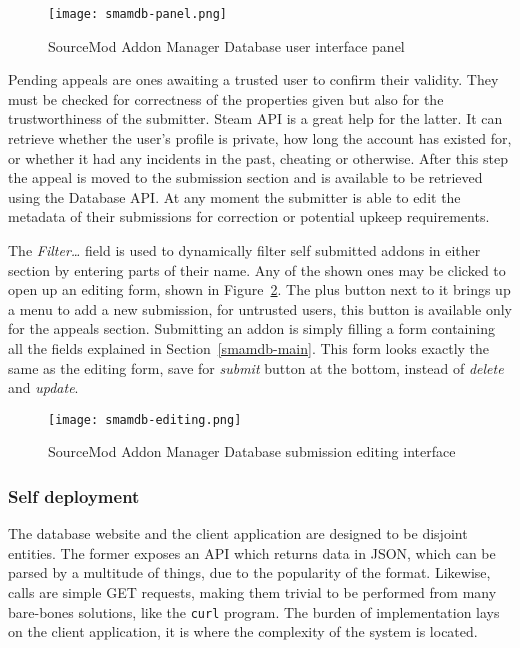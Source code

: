 \begin{figure}[H]
  \centering
  \texttt{[image: smamdb-panel.png]}
  \caption{SourceMod Addon Manager Database user interface panel}
  \label{fig:smamdb-panel}
\end{figure}

Pending appeals are ones awaiting a trusted user to confirm their validity.
They must be checked for correctness of the properties given but also for the trustworthiness of the submitter.
Steam API is a great help for the latter.
It can retrieve whether the user's profile is private, how long the account has existed for, or whether it had any incidents in the past, cheating or otherwise.
After this step the appeal is moved to the submission section and is available to be retrieved using the Database API\@.
At any moment the submitter is able to edit the metadata of their submissions for correction or potential upkeep requirements.

The \textit{Filter\dots} field is used to dynamically filter self submitted addons in either section by entering parts of their name.
Any of the shown ones may be clicked to open up an editing form, shown in Figure~\ref{fig:smamdb-editing}.
The plus button next to it brings up a menu to add a new submission, for untrusted users, this button is available only for the appeals section.
Submitting an addon is simply filling a form containing all the fields explained in Section~\ref{smamdb-main}.
This form looks exactly the same as the editing form, save for \textit{submit} button at the bottom, instead of \textit{delete} and \textit{update}.

\begin{figure}[H]
  \centering
  \texttt{[image: smamdb-editing.png]}
  \caption{SourceMod Addon Manager Database submission editing interface}
  \label{fig:smamdb-editing}
\end{figure}

\subsubsection{Self deployment}

The database website and the client application are designed to be disjoint entities.
The former exposes an API which returns data in JSON, which can be parsed by a multitude of things, due to the popularity of the format.
Likewise, calls are simple GET requests, making them trivial to be performed from many bare-bones solutions, like the \verb|curl| program.
The burden of implementation lays on the client application, it is where the complexity of the system is located.


